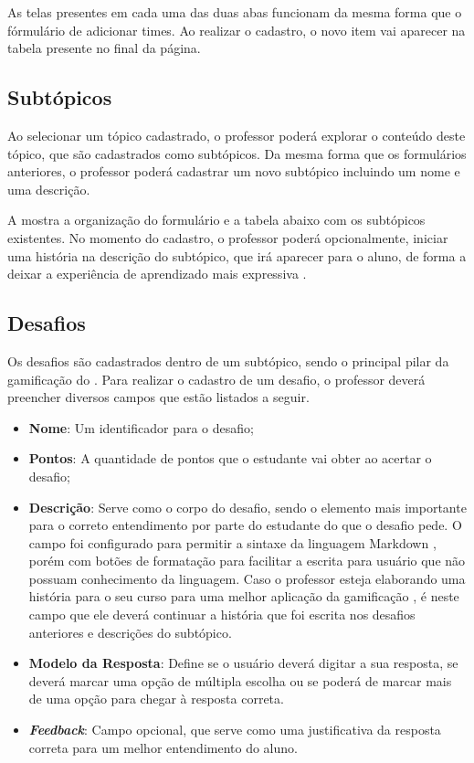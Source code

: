 As telas presentes em cada uma das duas abas funcionam da mesma forma que o fórmulário de adicionar times. Ao realizar o cadastro, o novo item vai aparecer na tabela presente no final da página.

\subsection{Subtópicos}

Ao selecionar um tópico cadastrado, o professor poderá explorar o conteúdo deste tópico, que são cadastrados como subtópicos. Da mesma forma que os formulários anteriores, o professor poderá cadastrar um novo subtópico incluindo um nome e uma descrição.


A  mostra a organização do formulário e a tabela abaixo com os subtópicos existentes. No momento do cadastro, o professor poderá opcionalmente, iniciar uma história na descrição do subtópico, que irá aparecer para o aluno, de forma a deixar a experiência de aprendizado mais expressiva \cite{gamification_motivates}.

\subsection{Desafios}

Os desafios são cadastrados dentro de um subtópico, sendo o principal pilar da gamificação do \appName. Para realizar o cadastro de um desafio, o professor deverá preencher diversos campos que estão listados a seguir.

\begin{itemize}
    \item \textbf{Nome}: Um identificador para o desafio;
    \item \textbf{Pontos}: A quantidade de pontos que o estudante vai obter ao acertar o desafio;
    \item \textbf{Descrição}: Serve como o corpo do desafio, sendo o elemento mais importante para o correto entendimento por parte do estudante do que o desafio pede. O campo foi configurado para permitir a sintaxe da linguagem Markdown \cite{markdown}, porém com botões de formatação para facilitar a escrita para usuário que não possuam conhecimento da linguagem. Caso o professor esteja elaborando uma história para o seu curso para uma melhor aplicação da gamificação \cite{gamification_motivates}, é neste campo que ele deverá continuar a história que foi escrita nos desafios anteriores e descrições do subtópico.
    \item \textbf{Modelo da Resposta}: Define se o usuário deverá digitar a sua resposta, se deverá marcar uma opção de múltipla escolha ou se poderá de marcar mais de uma opção para chegar à resposta correta.
    \item \textbf{\textit{Feedback}}: Campo opcional, que serve como uma justificativa da resposta correta para um melhor entendimento do aluno.
\end{itemize}

